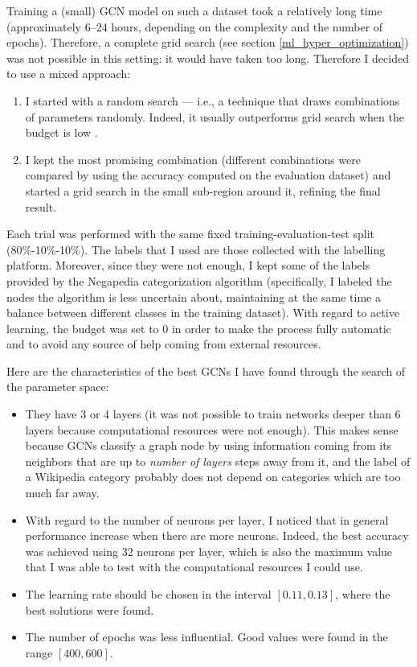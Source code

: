             Training a (small) GCN model on such a dataset took a relatively long time (approximately 6--24 hours, depending on the complexity and the number of epochs). Therefore, a complete grid search (see section \ref{ml_hyper_optimization}) was not possible in this setting: it would have taken too long. Therefore I decided to use a mixed approach:
            \begin{enumerate}
                \item I started with a random search --- i.e., a technique that draws combinations of parameters randomly. Indeed, it usually outperforms grid search when the budget is low \cite{Bergstra}.
                \item I kept the most promising combination (different combinations were compared by using the accuracy computed on the evaluation dataset) and started a grid search in the small sub-region around it, refining the final result.
            \end{enumerate}
            
            Each trial was performed with the same fixed training-evaluation-test split (80\%-10\%-10\%). The labels that I used are those collected with the labelling platform. Moreover, since they were not enough, I kept some of the labels provided by the Negapedia categorization algorithm (specifically, I labeled the nodes the algorithm is less uncertain about, maintaining at the same time a balance between different classes in the training dataset). With regard to active learning, the budget was set to \(0\) in order to make the process fully automatic and to avoid any source of help coming from external resources.
            
            Here are the characteristics of the best GCNs I have found through the search of the parameter space:
            \begin{itemize}
                \item They have 3 or 4 layers (it was not possible to train networks deeper than 6 layers because computational resources were not enough). This makes sense because GCNs classify a graph node by using information coming from its neighbors that are up to \emph{number of layers} steps away from it, and the label of a Wikipedia category probably does not depend on categories which are too much far away.
                \item With regard to the number of neurons per layer, I noticed that in general performance increase when there are more neurons. Indeed, the best accuracy was achieved using 32 neurons per layer, which is also the maximum value that I was able to test with the computational resources I could use.
                \item The learning rate should be chosen in the interval \(\left[0.11,0.13\right]\), where the best solutions were found.
                \item The number of epochs was less influential. Good values were found in the range \(\left[400,600\right]\).
            \end{itemize} 
            
